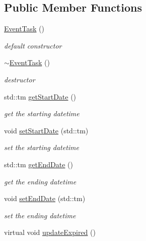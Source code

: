 \subsection*{Public Member Functions}
\begin{DoxyCompactItemize}
\item 
\hyperlink{class_do_lah_1_1_event_task_a00509da8b02cef034c65a2df3ab63d4e}{Event\+Task} ()
\begin{DoxyCompactList}\small\item\em default constructor \end{DoxyCompactList}\item 
\hyperlink{class_do_lah_1_1_event_task_a83f795120e46453650267225bacd05b3}{$\sim$\+Event\+Task} ()
\begin{DoxyCompactList}\small\item\em destructor \end{DoxyCompactList}\item 
std\+::tm \hyperlink{class_do_lah_1_1_event_task_a895c1148fe84e59cfc050717a383567d}{get\+Start\+Date} ()
\begin{DoxyCompactList}\small\item\em get the starting datetime \end{DoxyCompactList}\item 
void \hyperlink{class_do_lah_1_1_event_task_aa35cfdeaeec9ddfd33026ad250161fe4}{set\+Start\+Date} (std\+::tm)
\begin{DoxyCompactList}\small\item\em set the starting datetime \end{DoxyCompactList}\item 
std\+::tm \hyperlink{class_do_lah_1_1_event_task_ad10cb4179c9da10afeca6037bc9177e6}{get\+End\+Date} ()
\begin{DoxyCompactList}\small\item\em get the ending datetime \end{DoxyCompactList}\item 
void \hyperlink{class_do_lah_1_1_event_task_a7c7fab60cf79b0e276163da8b3bd0fa5}{set\+End\+Date} (std\+::tm)
\begin{DoxyCompactList}\small\item\em set the ending datetime \end{DoxyCompactList}\item 
virtual void \hyperlink{class_do_lah_1_1_event_task_ae2a071328fc27ae7c4ac48aad4099e86}{update\+Expired} ()
\end{DoxyCompactItemize}

